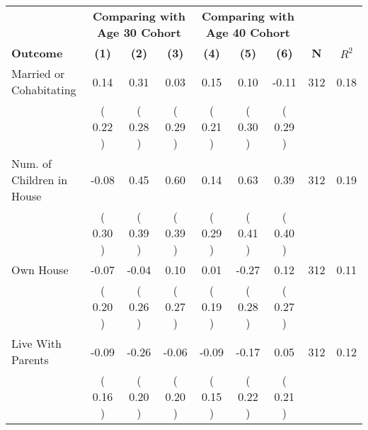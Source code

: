 \begin{tabular}{lcccccccc}
\toprule
 & \multicolumn{3}{c}{\textbf{Comparing with Age 30 Cohort}} & \multicolumn{3}{c}{\textbf{Comparing with Age 40 Cohort}} & \\
\cmidrule(lr){2-4} \cmidrule(lr){5-7} 
 \textbf{Outcome} & \textbf{(1)} & \textbf{(2)} & \textbf{(3)} & \textbf{(4)} & \textbf{(5)} & \textbf{(6)} & \textbf{N} & \textbf{$ R^2$} \\
\midrule
Married or Cohabitating &      0.14 &      0.31 &      0.03 &      0.15 &      0.10 &     -0.11 & 312 &       0.18 \\ 
 & (     0.22 ) & (     0.28 ) & (     0.29 ) & (     0.21 ) & (     0.30 ) & (     0.29 ) & \\
Num. of Children in House &     -0.08 &      0.45 &      0.60 &      0.14 &      0.63 &      0.39 & 312 &       0.19 \\ 
 & (     0.30 ) & (     0.39 ) & (     0.39 ) & (     0.29 ) & (     0.41 ) & (     0.40 ) & \\
Own House &     -0.07 &     -0.04 &      0.10 &      0.01 &     -0.27 &      0.12 & 312 &       0.11 \\ 
 & (     0.20 ) & (     0.26 ) & (     0.27 ) & (     0.19 ) & (     0.28 ) & (     0.27 ) & \\
Live With Parents &     -0.09 &     -0.26 &     -0.06 &     -0.09 &     -0.17 &      0.05 & 312 &       0.12 \\ 
 & (     0.16 ) & (     0.20 ) & (     0.20 ) & (     0.15 ) & (     0.22 ) & (     0.21 ) & \\
\bottomrule
\end{tabular}
